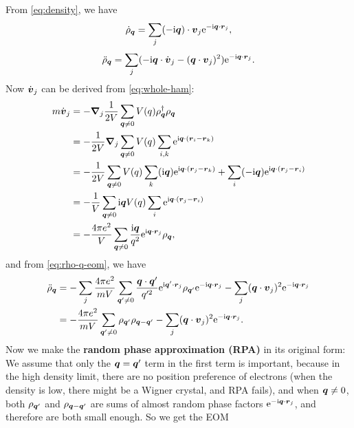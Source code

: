 \documentclass[hyperref, a4paper]{article}
\newcommand*{\ii}{\mathrm{i}}
\newcommand*{\ee}{\mathrm{e}}
\newcommand*{\concept}[1]{{\textbf{#1}}}
\begin{document}
From \eqref{eq:density}, we have 
\[
    \dot{\rho}_{\vb*{q}} = \sum_j (- \ii \vb*{q}) \cdot \vb*{v}_j \ee^{- \ii \vb*{q} \cdot \vb*{r}_j},
\]
\begin{equation}
    \ddot{\rho}_{\vb*{q}} = \sum_j (- \ii \vb*{q} \cdot \dot{\vb*{v}}_j - (\vb*{q} \cdot \vb*{v}_j)^2) \ee^{- \ii \vb*{q} \cdot \vb*{r}_j}.
    \label{eq:rho-q-eom}
\end{equation}
Now $\dot{\vb*{v}}_j$ can be derived from \eqref{eq:whole-ham}:
\[
    \begin{aligned}
        m \dot{\vb*{v}}_j &= - \grad_j \frac{1}{2V} \sum_{\vb*{q} \neq 0} V(q) \rho^\dagger_{\vb*{q}} \rho_{\vb*{q}} \\
        &= - \frac{1}{2V} \grad_j \sum_{\vb*{q} \neq 0} V(q) \sum_{i, k} \ee^{\ii \vb*{q} \cdot (\vb*{r}_i - \vb*{r}_k)} \\
        &= - \frac{1}{2V} \sum_{\vb*{q} \neq 0} V(q) \sum_k (\ii \vb*{q}) \ee^{\ii \vb*{q} \cdot (\vb*{r}_j - \vb*{r}_k)} + \sum_i (- \ii \vb*{q}) \ee^{\ii \vb*{q} \cdot (\vb*{r}_j - \vb*{r}_i)} \\
        &= - \frac{1}{V} \sum_{\vb*{q} \neq 0} \ii \vb*{q} V(q) \sum_i \ee^{\ii \vb*{q} \cdot (\vb*{r}_j - \vb*{r}_i)} \\
        &= - \frac{4 \pi e^2}{V} \sum_{\vb*{q} \neq 0} \frac{\ii \vb*{q}}{q^2} \ee^{\ii \vb*{q} \cdot \vb*{r}_j} \rho_{\vb*{q}},
    \end{aligned}
\]
and from \eqref{eq:rho-q-eom}, we have 
\[
    \begin{aligned}
        \ddot{\rho}_{\vb*{q}} &= - \sum_j \frac{4 \pi e^2}{m V} \sum_{\vb*{q}' \neq 0} \frac{\vb*{q} \cdot \vb*{q}'}{q'^2} \ee^{\ii \vb*{q}' \cdot \vb*{r}_j} \rho_{\vb*{q}'} \ee^{- \ii \vb*{q} \cdot \vb*{r}_j} - \sum_j (\vb*{q} \cdot \vb*{v}_j)^2 \ee^{- \ii \vb*{q} \cdot \vb*{r}_j} \\
        &= - \frac{4 \pi e^2}{m V} \sum_{\vb*{q}' \neq 0} \rho_{\vb*{q}'} \rho_{\vb*{q} - \vb*{q}'} - \sum_j (\vb*{q} \cdot \vb*{v}_j)^2 \ee^{- \ii \vb*{q} \cdot \vb*{r}_j}.
    \end{aligned}
\]
Now we make the \concept{random phase approximation (RPA)} in its original form: We assume that only the 
$\vb*{q} = \vb*{q}'$ term in the first term is important, because in the high density limit, there are no 
position preference of electrons (when the density is low, there might be a Wigner crystal, and RPA fails), 
and when $\vb*{q} \neq 0$, both $\rho_{\vb*{q}'}$ and $\rho_{\vb*{q} - \vb*{q}'}$ are sums of almost random 
phase factors $\ee^{- \ii \vb*{q} \cdot \vb*{r}_j}$, and therefore are both small enough. So we get the EOM 
\end{document}
